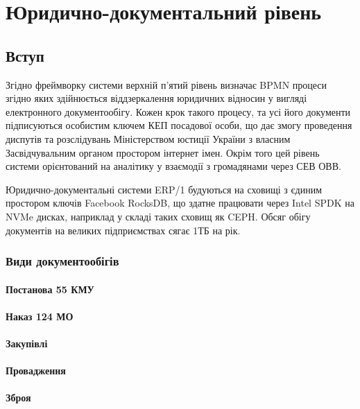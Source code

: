 \chapter{Юридично-документальний рівень}

\section{Вступ}

Згідно фреймворку системи верхній п'ятий рівень визначає BPMN
процеси згідно яких здійнюється віддзеркалення юридичних
відносин у вигляді електронного документообігу. Кожен крок
такого процесу, та усі його документи підписуються особистим
ключем КЕП посадової особи, що дає змогу проведення диспутів
та розслідувань Міністерством юстиції України з власним
Засвідчувальним органом простором інтернет імен.
Окрім того цей рівень системи орієнтований на аналітику
у взаємодії з громадянами через СЕВ ОВВ.

Юридично-документальні системи ERP/1 будуються на сховищі
з єдиним простором ключів Facebook RocksDB, що здатне працювати
через Intel SPDK на NVMe дисках, наприклад у складі таких сховищ
як CEPH. Обсяг обігу документів на великих підприємствах сягає 1ТБ на рік.

\subsection{Види документообігів}

\subsubsection{Постанова 55 КМУ}

\subsubsection{Наказ 124 МО}

\subsubsection{Закупівлі}

\subsubsection{Провадження}

\subsubsection{Зброя}


